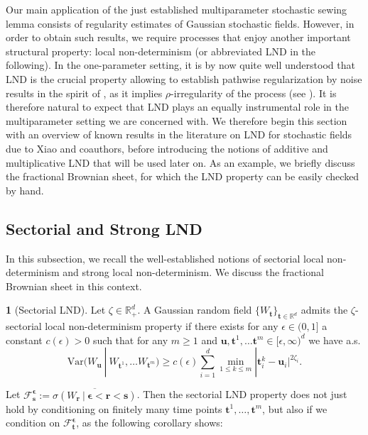\documentclass[11pt,oneside,english,reqno]{amsart}
\numberwithin{equation}{section}
\numberwithin{figure}{section}
\theoremstyle{plain}
\theoremstyle{definition}
\newtheorem{defn}[thm]{\protect\definitionname}
\theoremstyle{remark}
\theoremstyle{plain}
\theoremstyle{plain}
\theoremstyle{plain}
\theoremstyle{plain}
\theoremstyle{plain}
\providecommand{\definitionname}{Definition}
\newcommand{\cF}{\mathcal{F}}
\newcommand{\RR}{\mathbb{R}}
\newcommand{\br}{\mathbf{r}}
\newcommand{\bepsilon}{{\boldsymbol\epsilon}}
\newcommand{\bu}{\mathbf{u}}
\newcommand{\bs}{\mathbf{s}}
\newcommand{\bt}{\mathbf{t}}
\begin{document}
\noindent Our main application of the just established multiparameter stochastic sewing lemma consists of regularity estimates of Gaussian stochastic fields. However, in order to obtain such results, we require processes that enjoy another important structural property: local non-determinism (or abbreviated LND in the following). In the one-parameter setting, it is by now quite well understood that LND is the crucial property allowing to establish pathwise regularization by noise results in the spirit of \cite{gubicat}, as it implies $\rho$-irregularity of the process (see \cite[Theorem 30]{prevalence}). It is therefore natural to expect that LND plays an equally instrumental role in the multiparameter setting we are concerned with. We therefore begin this section with an overview of known results in the literature on LND for stochastic fields due to Xiao and coauthors, before introducing the notions of additive and multiplicative LND that will be used later on. As an example, we briefly discuss the fractional Brownian sheet, for which the LND property can be easily checked by hand.



\subsection{Sectorial and Strong LND}
In this subsection, we recall the well-established notions of sectorial local non-determinism and strong local non-determinism. We discuss the fractional Brownian sheet in this context. 


\begin{defn}[Sectorial LND] 
\label{sectorial dfn}\cite[Section 2.4, (C3)]{Xiao} Let $\zeta \in \RR^d_+$. A Gaussian random field $\{W_\bt\}_{\bt\in \RR^d}$ admits the $\zeta$-sectorial local non-determinism property if there exists for any $\epsilon\in (0, 1]$ a constant $c(\epsilon)>0$ such that for any $m\geq 1$ and $\bu, \bt^1, \dots \bt^m\in [\epsilon, \infty)^d$ we have a.s.
\begin{equation*}
    \mbox{Var}(W_\bu\ |\ W_{\bt^1}, \dots W_{\bt^m})\geq  c(\epsilon)\sum_{i=1}^d \min_{1\leq k\leq m}|\bt^k_i-\bu_i|^{2\zeta_i}. 
\end{equation*}
\end{defn}


\noindent Let $\cF_\bs^{\boldsymbol\epsilon} := \overline{\sigma(W_\br~\vert~ \boldsymbol\epsilon<\br<\bs)}$. Then the sectorial LND property does not just hold by conditioning on finitely many time points $\bt^1,\dots,\bt^m$, but also if we condition on $\cF_\bt^\bepsilon$, as the following corollary shows:
\end{document}
